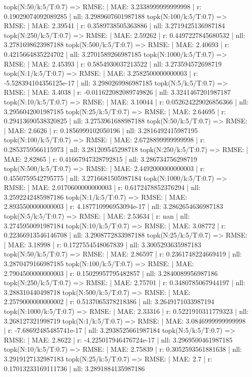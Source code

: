 topk(N:50/k:5/T:0.7) => RMSE: | MAE: 3.2338999999999998 | r: 0.19029074092089285 | nll: 3.2989607601987188
topk(N:100/k:5/T:0.7) => RMSE: | MAE: 2.39541 | r: 0.3589738505363886 | nll: 3.2719425136987184
topk(N:250/k:5/T:0.7) => RMSE: | MAE: 2.59262 | r: 0.4497227845680532 | nll: 3.2781698623987188
topk(N:500/k:5/T:0.7) => RMSE: | MAE: 2.40693 | r: 0.4215664835224702 | nll: 3.2701589266987185
topk(N:1000/k:5/T:0.7) => RMSE: | MAE: 2.45393 | r: 0.5854930037213522 | nll: 3.273594572698719
topk(N:1/k:5/T:0.7) => RMSE: | MAE: 3.2582500000000003 | r: -5.528394104356125e-17 | nll: 3.2980269986987185
topk(N:5/k:5/T:0.7) => RMSE: | MAE: 3.4038 | r: -0.011622082089749826 | nll: 3.3241467201987187
topk(N:10/k:5/T:0.7) => RMSE: | MAE: 3.10044 | r: 0.052624229026856366 | nll: 3.2956042001987185
topk(N:25/k:5/T:0.7) => RMSE: | MAE: 2.64695 | r: 0.29413690538320825 | nll: 3.2753961688987188
topk(N:50/k:5/T:0.7) => RMSE: | MAE: 2.6626 | r: 0.1856999102050196 | nll: 3.2816492415987195
topk(N:100/k:5/T:0.7) => RMSE: | MAE: 2.6728899999999998 | r: 0.2853759566115973 | nll: 3.281209545298718
topk(N:250/k:5/T:0.7) => RMSE: | MAE: 2.82865 | r: 0.41667947328792815 | nll: 3.286734756298719
topk(N:500/k:5/T:0.7) => RMSE: | MAE: 2.4492000000000003 | r: 0.4550759542795775 | nll: 3.2716681505987184
topk(N:1000/k:5/T:0.7) => RMSE: | MAE: 2.0170600000000003 | r: 0.6172478852376294 | nll: 3.2592242485987186
topk(N:1/k:5/T:0.7) => RMSE: | MAE: 2.8935500000000003 | r: 4.187710996953094e-17 | nll: 3.2862654636987183
topk(N:5/k:5/T:0.7) => RMSE: | MAE: 2.53634 | r: nan | nll: 3.2745950091987184
topk(N:10/k:5/T:0.7) => RMSE: | MAE: 3.08772 | r: 0.22366913546146708 | nll: 3.2908772833987188
topk(N:25/k:5/T:0.7) => RMSE: | MAE: 3.18998 | r: 0.1727554548067839 | nll: 3.3005293635987183
topk(N:50/k:5/T:0.7) => RMSE: | MAE: 2.86597 | r: 0.2361748224669419 | nll: 3.2870479166987185
topk(N:100/k:5/T:0.7) => RMSE: | MAE: 2.7904500000000003 | r: 0.15029957795482857 | nll: 3.2840089956987186
topk(N:250/k:5/T:0.7) => RMSE: | MAE: 2.75701 | r: 0.3480785067944197 | nll: 3.288310440498718
topk(N:500/k:5/T:0.7) => RMSE: | MAE: 2.2579000000000002 | r: 0.5137065378218386 | nll: 3.2649171033987194
topk(N:1000/k:5/T:0.7) => RMSE: | MAE: 2.33316 | r: 0.5221910311779323 | nll: 3.268127321998719
topk(N:1/k:5/T:0.7) => RMSE: | MAE: 3.0846999999999998 | r: -7.68692485485741e-17 | nll: 3.2938525661987184
topk(N:5/k:5/T:0.7) => RMSE: | MAE: 2.8622 | r: -4.225017946476724e-17 | nll: 3.2969500461987185
topk(N:10/k:5/T:0.7) => RMSE: | MAE: 2.75839 | r: 0.3052593561881638 | nll: 3.2919127132987183
topk(N:25/k:5/T:0.7) => RMSE: | MAE: 2.7 | r: 0.17013233169111736 | nll: 3.2891884135987186
